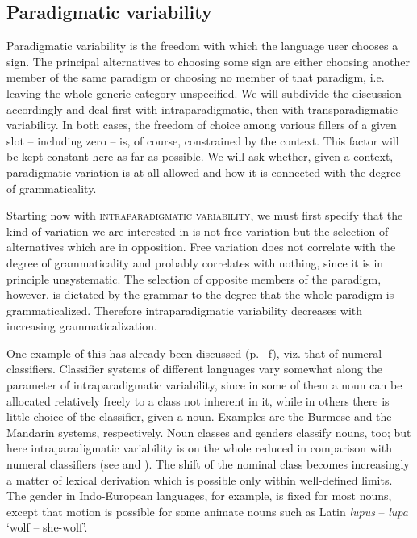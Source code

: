 \subsection{Paradigmatic variability} \label{sec:4.2.3}

Paradigmatic variability is the freedom with which the language user chooses a sign. The principal alternatives to choosing some sign are either choosing another member of the same paradigm or choosing no member of that paradigm, i.e. leaving the whole generic category unspecified. We will subdivide the discussion accordingly and deal first with intraparadigmatic, then with transparadigmatic variability. In both cases, the freedom of choice among various fillers of a given slot -- including zero -- is, of course, constrained by the context. This factor will be kept constant here as far as possible. We will ask whether, given a context, paradigmatic variation is at all allowed and how it is connected with the degree of grammaticality.

Starting now with \textsc{intraparadigmatic variability}, we must first specify that the kind of variation we are interested in is not free variation but the selection of alternatives which are in opposition. Free variation does not correlate with the degree of grammaticality and probably correlates with nothing, since it is in principle unsystematic. The selection of opposite members of the paradigm, however, is dictated by the grammar to the degree that the whole paradigm is grammaticalized. Therefore intraparadigmatic variability decreases with increasing grammaticalization.

One example of this has already been discussed (p.~\pageref{page65}%
f), viz. that of numeral classifiers. Classifier systems of different languages vary somewhat along the parameter of intraparadigmatic variability, since in some of them a noun can be allocated relatively freely to a class not inherent in it, while in others there is little choice of the classifier, given a noun. Examples are the Burmese and the Mandarin systems, respectively. Noun classes and genders classify nouns, too; but here intraparadigmatic variability is on the whole reduced in comparison with numeral classifiers (see \citealt{Serzisko1981} and \citealt[§6.3]{Lehmann1982b}). The shift of the nominal class becomes increasingly a matter of lexical derivation which is possible only within well-defined limits. The gender in Indo-European languages, for example, is fixed for most nouns, except that motion is possible for some animate nouns such as Latin \textit{lupus} -- \textit{lupa} ‘wolf -- she-wolf’.

